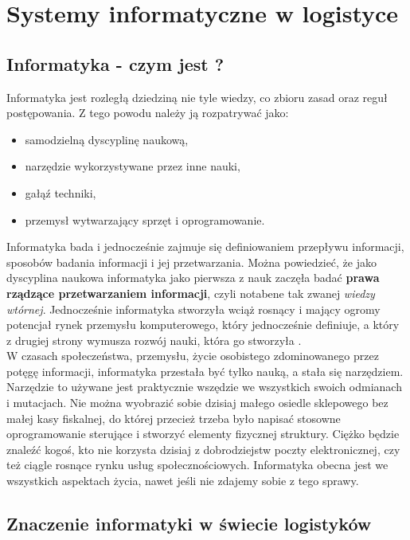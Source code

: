 \chapter{Systemy informatyczne w logistyce}
\label{c3:c3}

\section{Informatyka - czym jest ?}
	Informatyka jest rozległą dziedziną nie tyle wiedzy, co zbioru zasad oraz reguł postępowania.
	Z tego powodu należy ją rozpatrywać jako:
	\begin{itemize}
		\item samodzielną dyscyplinę naukową,
		\item narzędzie wykorzystywane przez inne nauki,
		\item gałąź techniki,
		\item przemysł wytwarzający sprzęt i oprogramowanie.
	\end{itemize}	 

	Informatyka bada i jednocześnie zajmuje się definiowaniem przepływu informacji, sposobów badania
	informacji i jej przetwarzania. Można powiedzieć, że jako dyscyplina naukowa informatyka 
	jako pierwsza z nauk zaczęła badać \textbf{prawa rządzące przetwarzaniem informacji}, czyli notabene
	tak zwanej \emph{wiedzy wtórnej}. Jednocześnie informatyka stworzyła wciąż rosnący i mający 
	ogromy potencjał rynek przemysłu komputerowego, który jednocześnie definiuje, a który 
	z drugiej strony wymusza rozwój nauki, która go stworzyła \cite{it_definition}.\\
	
	W czasach społeczeństwa, przemysłu, życie osobistego zdominowanego przez potęgę informacji, informatyka
	przestała być tylko nauką, a stała się narzędziem. Narzędzie to używane jest praktycznie wszędzie
	we wszystkich swoich odmianach i mutacjach. Nie można wyobrazić sobie dzisiaj małego osiedle sklepowego bez
	małej kasy fiskalnej, do której przecież trzeba było napisać stosowne oprogramowanie sterujące i stworzyć
	elementy fizycznej struktury. Ciężko będzie znaleźć kogoś, kto nie korzysta dzisiaj z dobrodziejstw poczty
	elektronicznej, czy też ciągle rosnące rynku usług społecznościowych. Informatyka obecna jest we
	wszystkich aspektach życia, nawet jeśli nie zdajemy sobie z tego sprawy.
\section{Znaczenie informatyki w świecie logistyków}
	
